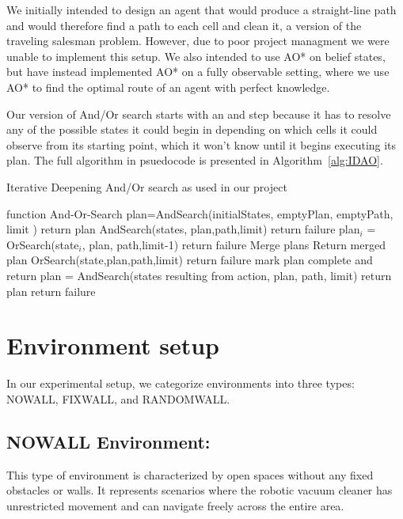 \documentclass{article}
\begin{document}
We initially intended to design an agent that would produce a straight-line path and would therefore find a path to each cell and clean it, a version of the traveling salesman problem. However, due to poor project managment we were unable to implement this setup. We also intended to use AO* on belief states, but have instead implemented AO* on a fully observable setting, where we use AO* to find the optimal route of an agent with perfect knowledge.

Our version of And/Or search starts with an and step because it has to resolve any of the possible states it could begin in depending on which cells it could observe from its starting point, which it won't know until it begins executing its plan. The full algorithm in psuedocode is presented in Algorithm~\ref{alg:IDAO}. 
\begin{algorithm}[h]
  \caption{Iterative Deepening And/Or search as used in our project}
  \begin{algorithmic}[1]
    \State function And-Or-Search
      \State plan=AndSearch(initialStates, emptyPlan, emptyPath, limit )
        \State return plan
      \EndIf
    \EndFor
    \State
    \State AndSearch(states, plan,path,limit)
      \State return failure
    \EndIf
     \State plan$_i$ = OrSearch(state$_i$, plan, path,limit-1)
        \State return failure
      \EndIf
      \State Merge plans
    \EndFor
    \State Return merged plan
    \State
    \State OrSearch(state,plan,path,limit)
      \State return failure
    \EndIf
      \State mark plan complete and return
    \EndIf
      \State plan = AndSearch(states resulting from action, plan, path, limit)
        \State return plan
      \EndIf
    \EndFor
    \State return failure
  \end{algorithmic}
  \label{alg:IDAO}
\end{algorithm}

\section{Environment setup}

In our experimental setup, we categorize environments into three types: NOWALL, FIXWALL, and RANDOMWALL.

\subsection{NOWALL Environment:} This type of environment is characterized by open spaces without any fixed obstacles or walls. It represents scenarios where the robotic vacuum cleaner has unrestricted movement and can navigate freely across the entire area.
\end{document}
